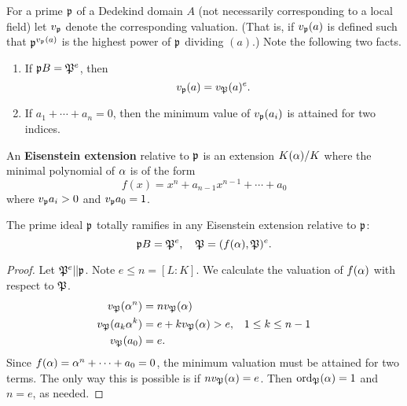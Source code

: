 For a prime $\mathfrak{p}$ of a Dedekind domain $A$ (not necessarily corresponding to a local field) let $v_{\mathfrak{p}}$ denote the corresponding valuation. (That is, if $v_{\mathfrak{p}}(a)$ is defined such that $\mathfrak{p}^{v_{\mathfrak{p}}(a)}$ is the highest power of $\mathfrak{p}$ dividing $(a)$.) 
Note the following two facts.
\begin{enumerate}
\item If $\mathfrak{p} B=\mathfrak{P}^e$, then
\[
v_{\mathfrak{p}}(a)=v_{\mathfrak{P}}(a)^e.
\]
\item If $a_1+\cdots +a_n=0$, then the minimum value of $v_{\mathfrak{p}}(a_i)$ is attained for two indices.
\end{enumerate}
\begin{df}
An \textbf{Eisenstein extension} relative to $\mathfrak{p}$ is an extension $K(\alpha)/K$ where the minimal polynomial of $\alpha$ is of the form
\[
f(x)=x^n+a_{n-1}x^{n-1}+\cdots +a_0
\]
where $v_{\mathfrak{p}} a_i>0$ and $v_{\mathfrak{p}} a_0=1$.
\end{df}
\begin{thm}
The prime ideal $\mathfrak{p}$ totally ramifies in any Eisenstein extension relative to $\mathfrak{p}$:
\[
\mathfrak{p} B=\mathfrak{P}^e, \quad \mathfrak{P}=(f(\alpha), \mathfrak{P})^e.
\]
\end{thm}
\begin{proof}
Let $\mathfrak{P}^e|| \mathfrak{p}$. Note $e\le n=[L:K]$.
We calculate the valuation of $f(\alpha)$ with respect to $\mathfrak{P}$.
\begin{align*}
v_{\mathfrak{P}}(\alpha^n)&= nv_{\mathfrak{P}}(\alpha)\\
v_{\mathfrak{P}}(a_k\alpha^k)&= e+kv_{\mathfrak{P}}(\alpha)>e,&1\le k\le n-1\\
v_{\mathfrak{P}}(a_0)&=e.
\end{align*}
Since $f(\alpha)=\alpha^n+\cdots +a_0=0$, the minimum valuation must be attained for two terms. The only way this is possible is if $nv_{\mathfrak{P}}(\alpha)=e$. Then  $\operatorname{ord}_{\mathfrak{P}}(\alpha)=1$ and $n=e$, as needed.
\end{proof}

